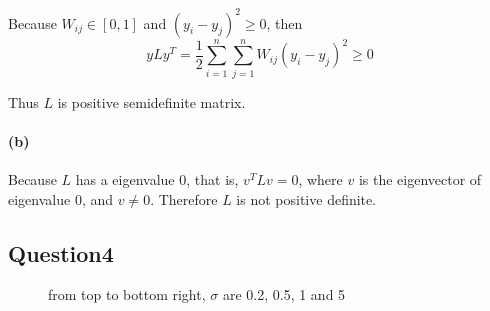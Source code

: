 \documentclass{article}
\begin{document}
Because  $W_{ij} \in [0,1]$ and $( y_{i} -  y_{j})^2 \geq 0 $, then
\begin{equation}
  yLy^T = \frac{1}{2} \sum^n_{i=1} \sum^n_{j=1} W_{ij} ( y_{i} -  y_{j})^2 \geq 0
\end{equation}

Thus $L$ is positive semidefinite matrix.

\paragraph{(b)}
Because $L$ has a eigenvalue 0, that is, $ v^{T}Lv = 0$, where $v$ is the eigenvector of eigenvalue 0, and $v \neq 0$. Therefore $L$ is not positive definite.


\subsection*{Question4}



\begin{figure}[h]
  \centering
  \qquad
  \qquad
  \qquad
  \caption{from top to bottom right, $\sigma$ are 0.2, 0.5, 1 and 5}
\end{figure}
\end{document}
